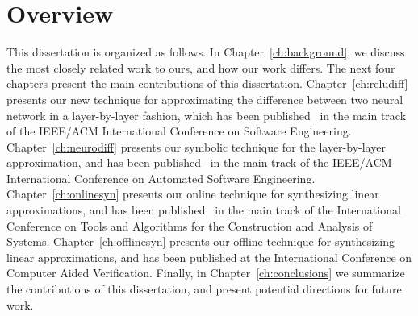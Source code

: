 \section{Overview}
This dissertation is organized as follows. In Chapter~\ref{ch:background}, we
discuss the most closely related work to ours, and how our work differs. The next
four chapters present the main contributions of this dissertation.
Chapter~\ref{ch:reludiff} presents our new technique for approximating the
difference between two neural network in a layer-by-layer fashion, which has been
published~\cite{paulsen2020reludiff} in the main track of the IEEE/ACM
International Conference on Software Engineering. Chapter~\ref{ch:neurodiff}
presents our symbolic technique for the layer-by-layer approximation, and has been
published~\cite{paulsen2020neurodiff} in the main track of the IEEE/ACM
International Conference on Automated Software Engineering.
Chapter~\ref{ch:onlinesyn} presents our online technique for synthesizing linear
approximations, and has been published~\cite{paulsen2022linsyn} in the main track
of the International Conference on Tools and Algorithms for the Construction and
Analysis of Systems. Chapter~\ref{ch:offlinesyn} presents our offline technique
for synthesizing linear approximations, and has been published at the
International Conference on Computer Aided Verification.
Finally, in Chapter~\ref{ch:conclusions} we summarize the contributions of this
dissertation, and present potential directions for future work.
